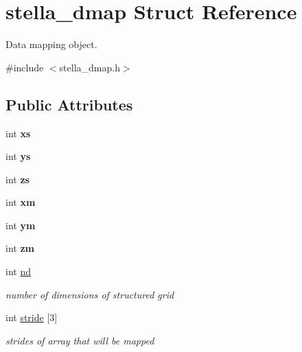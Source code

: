 \hypertarget{structstella__dmap}{}\section{stella\+\_\+dmap Struct Reference}
\label{structstella__dmap}


Data mapping object.  




{\ttfamily \#include $<$stella\+\_\+dmap.\+h$>$}

\subsection*{Public Attributes}
\begin{DoxyCompactItemize}
\item 
\mbox{\label{structstella__dmap_ae1538110e94bee9026b476a681c44946}} 
int {\bfseries xs}
\item 
\mbox{\label{structstella__dmap_a94190e8f2f3c1efee08b51752d95c6ec}} 
int {\bfseries ys}
\item 
\mbox{\label{structstella__dmap_a06bde1f9d13046c7f907a2ccdd38345e}} 
int {\bfseries zs}
\item 
\mbox{\label{structstella__dmap_a44f81af4ad90a0daaa293a5b27d23cd8}} 
int {\bfseries xm}
\item 
\mbox{\label{structstella__dmap_a1a8ce114a2fbc771a693a14353588ab9}} 
int {\bfseries ym}
\item 
\mbox{\label{structstella__dmap_af16139e8ef8d7724bbeb8af004176c68}} 
int {\bfseries zm}
\item 
\mbox{\label{structstella__dmap_a70743458c3c20e0bc910126f429ef45b}} 
int \mbox{\hyperlink{structstella__dmap_a70743458c3c20e0bc910126f429ef45b}{nd}}
\begin{DoxyCompactList}\small\item\em number of dimensions of structured grid \end{DoxyCompactList}\item 
\mbox{\label{structstella__dmap_afe5870832e891c0254aa65a3f2f72e3e}} 
int \mbox{\hyperlink{structstella__dmap_afe5870832e891c0254aa65a3f2f72e3e}{stride}} \mbox{[}3\mbox{]}
\begin{DoxyCompactList}\small\item\em strides of array that will be mapped \end{DoxyCompactList}\end{DoxyCompactItemize}


